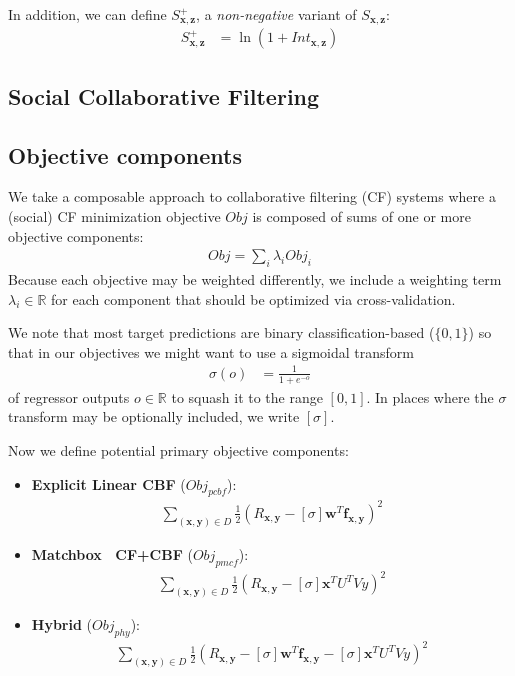\documentclass{sig-alternate}
\newcommand{\R}{\mathbb{R}}
\newcommand{\Obj}{\mathit{Obj}}
\newcommand{\pcbf}{\mathit{pcbf}}
\newcommand{\pmcf}{\mathit{pmcf}}
\newcommand{\phy}{\mathit{phy}}
\newcommand{\x}{\vec{x}}
\newcommand{\y}{\vec{y}}
\newcommand{\z}{\vec{z}}
\newcommand{\w}{\vec{w}}
\newcommand{\f}{\vec{f}}
\renewcommand{\vec}[1]{\mathbf{#1}}
\begin{document}
In addition, we can define $S^+_{\x,\z}$, a \emph{non-negative} 
variant of $S_{\x,\z}$:
\begin{align}
S^+_{\x,\z} & = \ln \left( 1 + \mathit{Int}_{\x,\z} \right)
\end{align}

\subsection{Social Collaborative Filtering}

\subsection{Objective components}

\label{sec:obj_comp}

We take a composable approach to collaborative filtering (CF) systems
where a (social) CF minimization 
objective $\mathit{Obj}$ is composed of sums of one or more
objective components:
\begin{align}
\mathit{Obj} = \sum_i \lambda_i \mathit{Obj}_i
\end{align}
Because each objective may be weighted differently, we include a 
weighting term $\lambda_i \in \R$ for each component that should be
optimized via cross-validation.

We note that most target predictions are binary 
classification-based ($\{0,1\}$)
so that in our objectives we might want to use a sigmoidal transform 
\begin{align}
\sigma(o) & = \frac{1}{1 + e^{-o}}
\end{align}
of regressor outputs $o \in \R$ to squash it 
to the range $[0, 1]$.  
In places where the $\sigma$ transform may be optionally included, 
we write $[\sigma]$.  

Now we define potential primary objective components:
\begin{itemize}
\item {\bf Explicit Linear CBF} ($\Obj_\pcbf$):
\begin{align}
\sum_{(\x,\y) \in D} \frac{1}{2} (R_{\x,\y} - [\sigma] \w^T \f_{\x,\y})^2
\end{align}
\item {\bf Matchbox~\cite{matchbox} CF+CBF} ($\Obj_\pmcf$):
\begin{align}
\sum_{(\x,\y) \in D} \frac{1}{2} (R_{\x,\y} - [\sigma] \x^T U^T V y)^2
\end{align}
\item {\bf Hybrid} ($\Obj_\phy$):
\begin{align}
\sum_{(\x,\y) \in D} \frac{1}{2} (R_{\x,\y} - [\sigma] \w^T \f_{\x,\y} - [\sigma] \x^T U^T V y)^2
\end{align}
\end{itemize}
\end{document}
